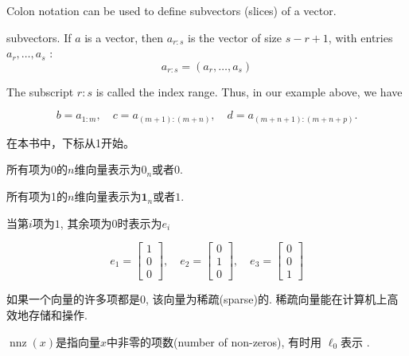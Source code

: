 \begin{definition}[Subvectors]
    Colon notation can be used to define subvectors (slices) of a vector.

    subvectors. If $ a $ is a vector, then $ a_{r: s} $ is the vector of size $ s-r+1 $, with entries $ a_{r}, \ldots, a_{s} $ :
    $$
    a_{r: s}=\left(a_{r}, \ldots, a_{s}\right)
    $$

    The subscript $ r: s $ is called the index range. Thus, in our example above, we have

    $$
    b=a_{1: m}, \quad c=a_{(m+1):(m+n)}, \quad d=a_{(m+n+1):(m+n+p)} .
    $$
\end{definition}

\begin{remark}
    在本书中，下标从1开始。
\end{remark}

\begin{definition}[零向量]
    所有项为$0$的$n$维向量表示为$0_n$或者$0$.
\end{definition}

\begin{definition}[全一向量]
      所有项为1的$n$维向量表示为$\boldsymbol{1}_n$或者$1$.
\end{definition}

\begin{definition}[单位向量]
    当第$i$项为$1$, 其余项为$0$时表示为$e_i$
\end{definition}

\begin{example}
    $$ {e}_{1}=\left[\begin{array}{l}1 \\ 0 \\ 0\end{array}\right], \quad e_{2}=\left[\begin{array}{l}0 \\ 1 \\ 0\end{array}\right], \quad e_{3}=\left[\begin{array}{l}0 \\ 0 \\ 1\end{array}\right] $$
\end{example}

\begin{definition}[稀疏向量]
    如果一个向量的许多项都是0, 该向量为稀疏(sparse)的. 稀疏向量能在计算机上高效地存储和操作. 

$\operatorname{nnz}(x)$是指向量$x$中非零的项数(number of non-zeros), 有时用 $\ell_0$表示 . 

\end{definition}

